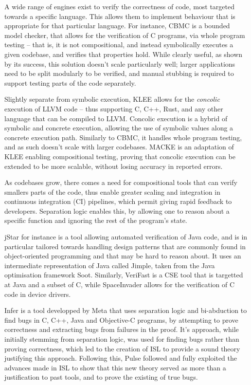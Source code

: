 A wide range of engines exist to verify the correctness of code, most targeted towards a specific language. This allows them to implement behaviour that is appropriate for that particular language. 
For instance, CBMC \cite{cbmc} is a bounded model checker, that allows for the verification of C programs, via whole program testing -- that is, it is not compositional, and instead symbolically executes a given codebase, and verifies that properties hold. While clearly useful, as shown by its success, this solution doesn't scale particularly well; larger applications need to be split modularly to be verified, and manual stubbing is required to support testing parts of the code separately.

Slightly separate from symbolic execution, KLEE \cite{klee} allows for the \emph{concolic} execution of LLVM code -- thus supporting C, C++, Rust, and any other language that can be compiled to LLVM. Concolic execution is a hybrid of symbolic and concrete execution, allowing the use of symbolic values along a concrete execution path. Similarly to CBMC, it handles whole program testing, and as such doesn't scale with larger codebases. MACKE \cite{macke} is an adaptation of KLEE enabling compositional testing, proving that concolic execution can be extended to be more scalable, without losing accuracy in reported errors.

As codebases grow, there comes a need for compositional tools that can verify smallers parts of the code, thus enable greater scaling and integration in continuous integration (CI) pipelines, which permit giving rapid feedback to developers. Separation logic enables this, by allowing one to reason about a specific function and ignoring the rest of the program's state.

jStar \cite{jstar} for instance is a tool allowing automated verification of Java code, and is in particular tailored towards handling design patterns that are commonly found in object-oriented programming and that may be hard to reason about. It uses an intermediate representation of Java called Jimple, taken from the Java optimisation framework Soot. Similarly, VeriFast \cite{verifast} is a CSE tool that is targetted at Java and a subset of C, while SpaceInvader \cite{spaceinvader} allows for the verification of C code in device drivers.

Infer \cite{infer} is a tool developped by Meta that uses separation logic and bi-abduction to find bugs in C, C++, Java and Objective-C programs, by attempting to prove correctness and extracting bugs from failures in the proof. It's approach, while initially stemming from separation logic, was used for finding bugs rather than proving correctness, which led to the creation of ISL \cite{isl} to provide a sound theory justifying this approach. Following this, Pulse \cite{pulse} followed and fully exploited the advances made in ISL to show that this new theory served as more than a justification to past tools, and to prove the existing of true bugs. 

